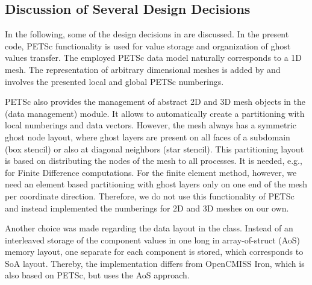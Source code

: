 \subsection{Discussion of Several Design Decisions}
In the following, some of the design decisions in  are discussed.
In the present code, PETSc functionality is used for value storage and organization of ghost values transfer. 
The employed PETSc data model naturally corresponds to a 1D mesh.
The representation of arbitrary dimensional meshes is added by \opendihu{} and involves the presented local and global PETSc numberings. 

PETSc also provides the management of abstract 2D and 3D mesh objects in the  (data management) module. It allows to automatically create a partitioning with local numberings and data vectors. However, the mesh always has a symmetric ghost node layout, where ghost layers are present on all faces of a subdomain (box stencil) or also at diagonal neighbors (star stencil). This partitioning layout is based on distributing the nodes of the mesh to all processes. It is needed, e.g., for Finite Difference computations. For the finite element method, however, we need an element based partitioning with ghost layers only on one end of the mesh per coordinate direction. Therefore, we do not use this functionality of PETSc and instead implemented the numberings for 2D and 3D meshes on our own.

Another choice was made regarding the data layout in the  class. Instead of an interleaved storage of the component values in one long \Vec{} in array-of-struct (AoS) memory layout, one separate \Vec{} for each component is stored, which corresponds to SoA layout. 
Thereby, the implementation differs from OpenCMISS Iron, which is also based on PETSc, but uses the AoS  approach. 


